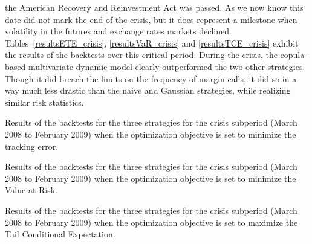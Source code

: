 the American Recovery and Reinvestment Act was passed. As
we now know this date did not mark the end of the crisis, but it does
represent a milestone when volatility in the futures and exchange rates
markets declined. Tables~\ref{resultsETE_crisis}, \ref{resultsVaR_crisis} and
\ref{resultsTCE_crisis} exhibit the results of the backtests
over this critical period. During the crisis, the copula-based multivariate
dynamic model clearly outperformed the two other strategies. Though it did
breach the limits on the frequency of margin calls, it did so in a way much less
drastic than the naive and Gaussian strategies, while realizing similar risk statistics.
\begin{table}[p]
    \begin{adjustwidth}{-1in}{-1in}
    \centering
    
    \end{adjustwidth}
    \caption[Results of the backtests - Minimized ETE - 2008-2009]{Results of the backtests for the three strategies for the crisis subperiod (March 2008 to February 2009) when the optimization objective is set to minimize the tracking error.}
    \label{resultsETE_crisis}
\end{table}
\begin{table}[p]
    \begin{adjustwidth}{-1in}{-1in}
    \centering
    
    \end{adjustwidth}
    \caption[Results of the backtests - Minimized VaR - 2008-2009]{Results of the backtests for the three strategies for the crisis subperiod (March 2008 to February 2009) when the optimization objective is set to minimize the Value-at-Risk.}
    \label{resultsVaR_crisis}
\end{table}
\begin{table}[p]
    \begin{adjustwidth}{-1in}{-1in}
    \centering
    
    \end{adjustwidth}
    \caption[Results of the backtests - Minimized TCE - 2008-2009]{Results of the backtests for the three strategies for the crisis subperiod (March 2008 to February 2009) when the optimization objective is set to maximize the Tail Conditional Expectation.}
    \label{resultsTCE_crisis}
\end{table}

